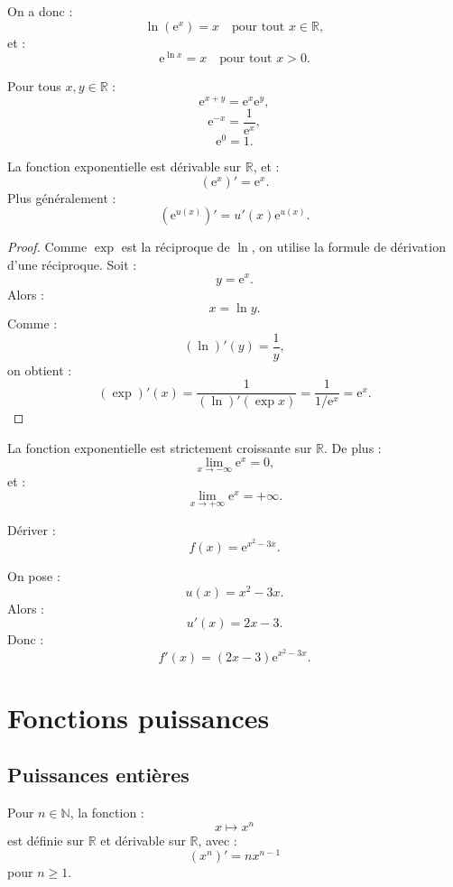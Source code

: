 \documentclass[11pt,a4paper]{article}
\newcommand{\N}{\mathbb N}
\newcommand{\R}{\mathbb R}
\newcommand{\e}{\mathrm e}
\begin{document}
On a donc :
\[
\ln(\e^x)=x
\quad\text{pour tout }x\in\R,
\]
et :
\[
\e^{\ln x}=x
\quad\text{pour tout }x>0.
\]

\begin{theorembox}
Pour tous \(x,y\in\R\) :
\[
\e^{x+y}=\e^x\e^y,
\]
\[
\e^{-x}=\frac1{\e^x},
\]
\[
\e^0=1.
\]
\end{theorembox}

\begin{theorembox}
La fonction exponentielle est dérivable sur \(\R\), et :
\[
(\e^x)'=\e^x.
\]
Plus généralement :
\[
(\e^{u(x)})'=u'(x)\e^{u(x)}.
\]
\end{theorembox}

\begin{proof}
Comme \(\exp\) est la réciproque de \(\ln\), on utilise la formule de dérivation d'une réciproque.  
Soit :
\[
y=\e^x.
\]
Alors :
\[
x=\ln y.
\]
Comme :
\[
(\ln)'(y)=\frac1y,
\]
on obtient :
\[
(\exp)'(x)=\frac1{(\ln)'(\exp x)}
=
\frac1{1/\e^x}
=
\e^x.
\]
\end{proof}

\begin{theorembox}
La fonction exponentielle est strictement croissante sur \(\R\).  
De plus :
\[
\lim_{x\to-\infty}\e^x=0,
\]
et :
\[
\lim_{x\to+\infty}\e^x=+\infty.
\]
\end{theorembox}

\begin{exercicebox}[Exponentielle]
Dériver :
\[
f(x)=\e^{x^2-3x}.
\]
\end{exercicebox}

\begin{correctionbox}
On pose :
\[
u(x)=x^2-3x.
\]
Alors :
\[
u'(x)=2x-3.
\]
Donc :
\[
f'(x)=(2x-3)\e^{x^2-3x}.
\]
\end{correctionbox}

\section{Fonctions puissances}

\subsection{Puissances entières}

Pour \(n\in\N\), la fonction :
\[
x\mapsto x^n
\]
est définie sur \(\R\) et dérivable sur \(\R\), avec :
\[
(x^n)'=nx^{n-1}
\]
pour \(n\geq1\).
\end{document}
